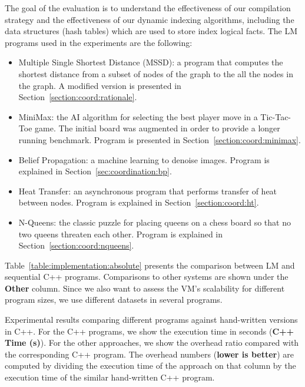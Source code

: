 The goal of the evaluation is to understand the effectiveness of our compilation
strategy and the effectiveness of our dynamic indexing algorithms, including the
data structures (hash tables) which are used to store index logical facts. The
LM programs used in the experiments are the following:

\begin{itemize}
   \item Multiple Single Shortest Distance (MSSD): a program that computes the
      shortest distance from a subset of nodes of the graph to the all the nodes
      in the graph. A modified version is presented in
      Section~\ref{section:coord:rationale}.

      
    \item MiniMax: the AI algorithm for selecting the best player move in a
       Tic-Tac-Toe game. The initial board was augmented in order to provide a
       longer running benchmark. Program is presented in
       Section~\ref{section:coord:minimax}.

   \item Belief Propagation: a machine learning to denoise images. Program is
      explained in Section~\ref{sec:coordination:bp}.

    \item Heat Transfer: an asynchronous program that performs transfer of heat
       between nodes. Program is explained in Section~\ref{section:coord:ht}.

   \item N-Queens: the classic puzzle for placing queens on a chess board so
      that no two queens threaten each other. Program is explained in
      Section~\ref{section:coord:nqueens}.

\end{itemize}

Table~\ref{table:implementation:absolute} presents the comparison between LM and
sequential C++ programs. Comparisons to other systems are shown under the
\textbf{Other} column. Since we also want to assess the VM's scalability for
different program sizes, we use different datasets in several programs.

\begin{table}[ht]
   \begin{center}
      
   \end{center}

   \caption{Experimental results comparing different programs against
      hand-written versions in C++. For the C++ programs, we show the execution
      time in seconds (\textbf{C++ Time (s)}). For the other approaches, we show
      the overhead ratio compared with the corresponding C++ program. The
      overhead numbers (\textbf{lower is better}) are computed by dividing the
   execution time of the approach on that column by the execution time of the
similar hand-written C++ program.}

   \label{table:implementation:absolute}
\end{table}

